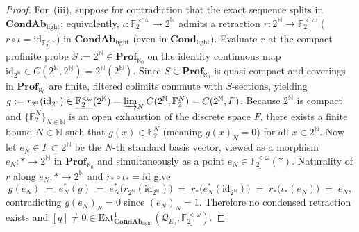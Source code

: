 \documentclass[10pt,twoside,openright]{book}
\theoremstyle{crmplain}
\theoremstyle{crmdef}
\theoremstyle{crmremark}
\begin{document}
\begin{proof}
For~(iii), suppose for contradiction that the exact sequence splits in $\mathbf{CondAb}_{\mathrm{light}}$; equivalently, $\iota : \underline{\mathbb{F}_2^{<\omega}} \to \underline{2^{\mathbb{N}}}$ admits a retraction $r : \underline{2^{\mathbb{N}}} \to \underline{\mathbb{F}_2^{<\omega}}$ ($r \circ \iota = \mathrm{id}_{\underline{\mathbb{F}_2^{<\omega}}}$) in $\mathbf{CondAb}_{\mathrm{light}}$ (even in $\mathbf{Cond}_{\mathrm{light}}$). Evaluate $r$ at the compact profinite probe $S := 2^{\mathbb{N}} \in \mathbf{Prof}_{\aleph_0}$ on the identity continuous map $\mathrm{id}_{2^{\mathbb{N}}} \in C(2^{\mathbb{N}}, 2^{\mathbb{N}}) = \underline{2^{\mathbb{N}}}(2^{\mathbb{N}})$. Since $S \in \mathbf{Prof}_{\aleph_0}$ is quasi-compact and coverings in $\mathbf{Prof}_{\aleph_0}$ are finite, filtered colimits commute with $S$-sections, yielding $g := r_{2^{\mathbb{N}}}(\mathrm{id}_{2^{\mathbb{N}}}) \in \underline{\mathbb{F}_2^{<\omega}}(2^{\mathbb{N}}) = \varinjlim_N C(2^{\mathbb{N}}, \mathbb{F}_2^N) = C(2^{\mathbb{N}}, F)$. Because $2^{\mathbb{N}}$ is compact and $\{\mathbb{F}_2^N\}_{N \in \mathbb{N}}$ is an open exhaustion of the discrete space $F$, there exists a finite bound $N \in \mathbb{N}$ such that $g(x) \in \mathbb{F}_2^N$ (meaning $g(x)_N = 0$) for all $x \in 2^{\mathbb{N}}$. Now let $e_N \in F \subset 2^{\mathbb{N}}$ be the $N$-th standard basis vector, viewed as a morphism $e_N : * \to 2^{\mathbb{N}}$ in $\mathbf{Prof}_{\aleph_0}$ and simultaneously as a point $e_N \in \underline{\mathbb{F}_2^{<\omega}}(*)$. Naturality of $r$ along $e_N : * \to 2^{\mathbb{N}}$ and $r_* \circ \iota_* = \mathrm{id}$ give
\[
  g(e_N) \;=\; e_N^*(g) \;=\; e_N^*\bigl(r_{2^{\mathbb{N}}}(\mathrm{id}_{2^{\mathbb{N}}})\bigr) \;=\; r_*\bigl(e_N^*(\mathrm{id}_{2^{\mathbb{N}}})\bigr) \;=\; r_*\bigl(\iota_*(e_N)\bigr) \;=\; e_N,
\]
contradicting $g(e_N)_N = 0$ since $(e_N)_N = 1$. Therefore no condensed retraction exists and $[q] \neq 0 \in \mathrm{Ext}^1_{\mathbf{CondAb}_{\mathrm{light}}}(\mathcal{Q}_{E_0}, \underline{\mathbb{F}_2^{<\omega}})$.
\end{proof}
\end{document}
